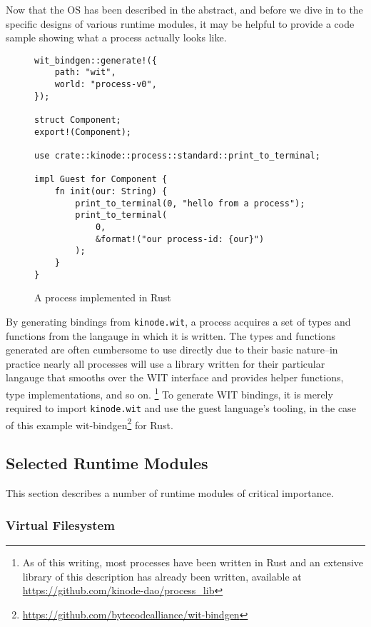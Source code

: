 \documentclass[runningheads]{llncs}
\begin{document}
Now that the OS has been described in the abstract, and before we dive in to the specific designs of various runtime modules, it may be helpful to provide a code sample showing what a process actually looks like.

\begin{figure}[H]
\begin{verbatim}
wit_bindgen::generate!({
    path: "wit",
    world: "process-v0",
});

struct Component;
export!(Component);

use crate::kinode::process::standard::print_to_terminal;

impl Guest for Component {
    fn init(our: String) {
        print_to_terminal(0, "hello from a process");
        print_to_terminal(
            0,
            &format!("our process-id: {our}")
        );
    }
}
\end{verbatim}
    \caption{A process implemented in Rust}
    \label{fig:example process}
\end{figure}

By generating bindings from \verb|kinode.wit|, a process acquires a set of types and functions from the langauge in which it is written.
The types and functions generated are often cumbersome to use directly due to their basic nature–in practice nearly all processes will use a library written for their particular langauge that smooths over the WIT interface and provides helper functions, type implementations, and so on.
\footnote{ As of this writing, most processes have been written in Rust and an extensive library of this description has already been written, available at \url{https://github.com/kinode-dao/process\_lib} }
To generate WIT bindings, it is merely required to import \verb|kinode.wit| and use the guest language's tooling, in the case of this example wit-bindgen\footnote{\url{https://github.com/bytecodealliance/wit-bindgen}} for Rust.

\subsection{Selected Runtime Modules}
\label{sec:osmodules}

This section describes a number of runtime modules of critical importance.

\subsubsection{Virtual Filesystem}
\label{sec:osvfs}
\end{document}
